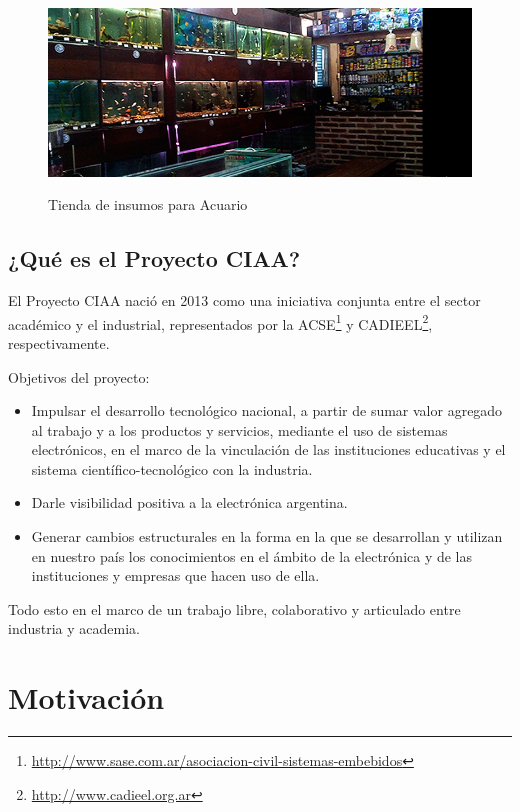\begin{figure}[]
	\centering
    \includegraphics[width=.7\textwidth]{./Figures/acuarioTienda.jpg}
	\label{fig:acuarioTienda}
	\caption{Tienda de insumos para Acuario}
\end{figure}

\subsection{¿Qué es el Proyecto CIAA?}
\label{sec:proyecto-ciaa}

El Proyecto CIAA nació en 2013 como una iniciativa conjunta entre el sector académico y el industrial, representados por la ACSE\footnote{\url{http://www.sase.com.ar/asociacion-civil-sistemas-embebidos}} y CADIEEL\footnote{\url{http://www.cadieel.org.ar}}, respectivamente.

Objetivos del proyecto:

\begin{itemize}
	\item Impulsar el desarrollo tecnológico nacional, a partir de sumar valor agregado al trabajo y a los productos y servicios, mediante el uso de sistemas electrónicos, en el marco de la vinculación de las instituciones educativas y el sistema científico-tecnológico con la industria.
	\item Darle visibilidad positiva a la electrónica argentina.
	\item Generar cambios estructurales en la forma en la que se desarrollan y utilizan en nuestro país los conocimientos en el ámbito de la electrónica y de las instituciones y empresas que hacen uso de ella.
\end{itemize}

Todo esto en el marco de un trabajo libre, colaborativo y articulado entre industria y academia. 


\section{Motivación}

